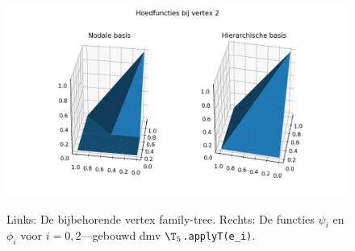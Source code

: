 \documentclass[11pt,a4paper]{amsart}
\theoremstyle{definition}
\begin{document}
\begin{figure}
\begin{minipage}{0.55\linewidth}
    \vspace{-1em}
    \includegraphics[width=\linewidth]{img/h2.png}\\
    \vspace{-2em}
  \end{minipage}
  \caption{Links: De bijbehorende vertex family-tree. Rechts: De functies $\psi_i$ en $\phi_i$ voor $i=0,2$---gebouwd dmv $\T_5$\texttt{.applyT(e\_i)}.}
\end{figure}
\end{document}
